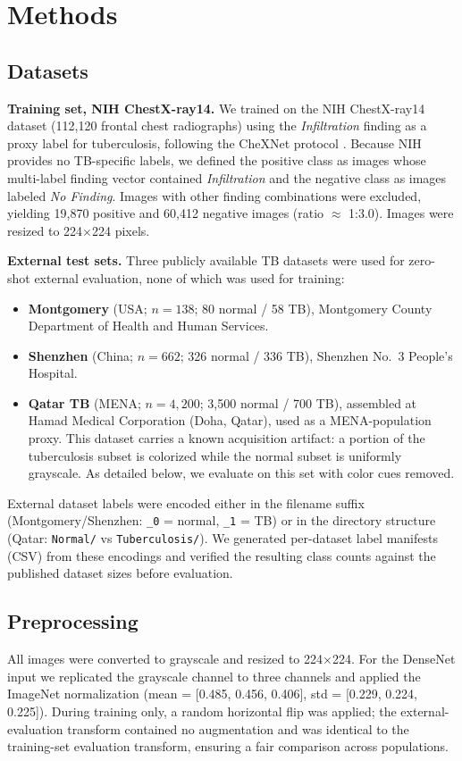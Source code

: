 \documentclass[runningheads]{llncs}
\begin{document}
\section{Methods}
\subsection{Datasets}
\textbf{Training set, NIH ChestX-ray14.} We trained on the NIH ChestX-ray14 dataset (112,120 frontal chest radiographs) using the \emph{Infiltration} finding as a proxy label for tuberculosis, following the CheXNet protocol \cite{rajpurkar2017}. Because NIH provides no TB-specific labels, we defined the positive class as images whose multi-label finding vector contained \emph{Infiltration} and the negative class as images labeled \emph{No Finding}. Images with other finding combinations were excluded, yielding 19,870 positive and 60,412 negative images (ratio $\approx$ 1:3.0). Images were resized to 224$\times$224 pixels.

\textbf{External test sets.} Three publicly available TB datasets were used for zero-shot external evaluation, none of which was used for training:
\begin{itemize}
\item \textbf{Montgomery} (USA; $n=138$; 80 normal / 58 TB), Montgomery County Department of Health and Human Services.
\item \textbf{Shenzhen} (China; $n=662$; 326 normal / 336 TB), Shenzhen No.~3 People's Hospital.
\item \textbf{Qatar TB} (MENA; $n=4{,}200$; 3,500 normal / 700 TB), assembled at Hamad Medical Corporation (Doha, Qatar), used as a MENA-population proxy. This dataset carries a known acquisition artifact: a portion of the tuberculosis subset is colorized while the normal subset is uniformly grayscale. As detailed below, we evaluate on this set with color cues removed.
\end{itemize}
External dataset labels were encoded either in the filename suffix (Montgomery/Shenzhen: \texttt{\_0} = normal, \texttt{\_1} = TB) or in the directory structure (Qatar: \texttt{Normal/} vs \texttt{Tuberculosis/}). We generated per-dataset label manifests (CSV) from these encodings and verified the resulting class counts against the published dataset sizes before evaluation.

\subsection{Preprocessing}
All images were converted to grayscale and resized to 224$\times$224. For the DenseNet input we replicated the grayscale channel to three channels and applied the ImageNet normalization (mean = [0.485, 0.456, 0.406], std = [0.229, 0.224, 0.225]). During training only, a random horizontal flip was applied; the external-evaluation transform contained no augmentation and was identical to the training-set evaluation transform, ensuring a fair comparison across populations.
\end{document}
